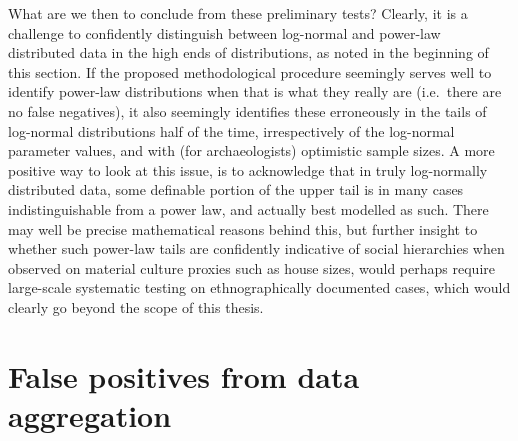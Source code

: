 \documentclass[
  12pt,
]{book}
\begin{document}
What are we then to conclude from these preliminary tests? Clearly, it is a challenge to confidently distinguish between log-normal and power-law distributed data in the high ends of distributions, as noted in the beginning of this section. If the proposed methodological procedure seemingly serves well to identify power-law distributions when that is what they really are (i.e.~there are no false negatives), it also seemingly identifies these erroneously in the tails of log-normal distributions half of the time, irrespectively of the log-normal parameter values, and with (for archaeologists) optimistic sample sizes. A more positive way to look at this issue, is to acknowledge that in truly log-normally distributed data, some definable portion of the upper tail is in many cases indistinguishable from a power law, and actually best modelled as such. There may well be precise mathematical reasons behind this, but further insight to whether such power-law tails are confidently indicative of social hierarchies when observed on material culture proxies such as house sizes, would perhaps require large-scale systematic testing on ethnographically documented cases, which would clearly go beyond the scope of this thesis.

\FloatBarrier

\hypertarget{false-positives-from-data-aggregation}{%
\section{False positives from data aggregation}\label{false-positives-from-data-aggregation}}
\end{document}
